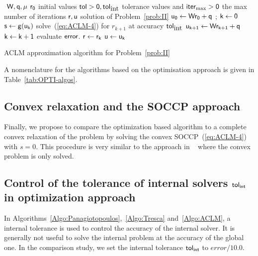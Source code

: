 \begin{algorithm}
  \begin{algorithmic}
    {\sf
      \STATE $ $ 
      \REQUIRE $\sf W,q,\mu$
      \REQUIRE $\sf r_0$ initial values
      \REQUIRE $\sf tol >0, tol_{\mbox{int}}$  tolerance values and $\sf iter_{\max}  >0$ the max number of iterations
      \ENSURE  $\sf r,u$ solution of Problem~\ref{prob:II}
      \STATE $\sf u_{0} \leftarrow W r_0 + q $ ; $\sf k \leftarrow 0$ 
      \STATE $\sf s \leftarrow g(u_{k})$ 
      \STATE solve~(\ref{eq:ACLM-4}) for $r_{k+1}$ at accuracy $\sf tol_{\mbox{int}}$
      \STATE $\sf u_{k+1} \leftarrow W r_{k+1} + q$ 
      \STATE $\sf k \leftarrow k+1$
      \STATE evaluate $\sf error$.
      \ENDWHILE
      \STATE $\sf r \leftarrow r_{k}$ 
      \STATE $\sf u \leftarrow u_k$ 
    }
  \end{algorithmic}
  \caption{ACLM approximation algorithm for Problem~\ref{prob:II}}
  \label{Algo:ACLM}
\end{algorithm}

A nomenclature for the algorithms based on the optimisation approach is given in Table~\ref{tab:OPTI-algos}.
\subsection{Convex relaxation and the SOCCP approach}

Finally, we propose to compare the optimization based algorithm to a complete convex relaxation of the problem by solving the convex SOCCP~(\ref{eq:ACLM-4}) with $s=0$. This procedure is very similar to the approach in ~\cite{Tasora.Anistescu_CMAME2009,Anistescu.Tasora_COA2010,Tasora.Anistescu_CMAME2011} where the convex problem is only solved.


\subsection{Control of the tolerance of internal solvers $\sf tol_{{int}}$ in optimization approach}

In Algorithms~\ref{Algo:Panagiotopoulos},~\ref{Algo:Tresca} and~\ref{Algo:ACLM}, a internal tolerance is used to control the accuracy of the internal solver. It is generally not useful to solve the internal problem at the accuracy of the global one. In the comparison study, we set the internal tolerance $\sf tol_{{int}}$ to $error/10.0$.

